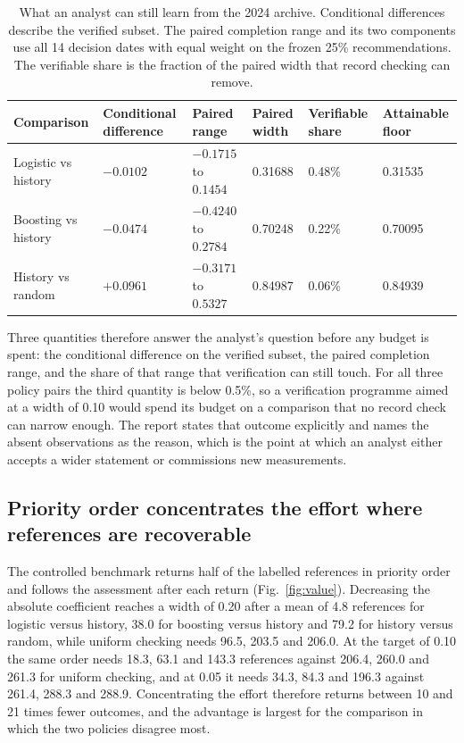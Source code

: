 \documentclass[a4paper,fleqn,longmktitle]{cas-sc}
\begin{document}
\begin{table}[pos=h]
\caption{What an analyst can still learn from the 2024 archive. Conditional differences describe the verified subset. The paired completion range and its two components use all 14 decision dates with equal weight on the frozen 25\% recommendations. The verifiable share is the fraction of the paired width that record checking can remove.}\label{tbl:decision}
\small
\begin{tabular}{@{}p{}p{}p{}p{}p{}p{}@{}}
\toprule
Comparison & Conditional difference & Paired range & Paired width & Verifiable share & Attainable floor\\
\midrule
Logistic vs history & $-0.0102$ & $-0.1715$ to $0.1454$ & 0.31688 & 0.48\% & 0.31535\\
Boosting vs history & $-0.0474$ & $-0.4240$ to $0.2784$ & 0.70248 & 0.22\% & 0.70095\\
History vs random & $+0.0961$ & $-0.3171$ to $0.5327$ & 0.84987 & 0.06\% & 0.84939\\
\bottomrule
\end{tabular}
\end{table}

Three quantities therefore answer the analyst's question before any budget is spent: the conditional difference on the verified subset, the paired completion range, and the share of that range that verification can still touch. For all three policy pairs the third quantity is below 0.5\%, so a verification programme aimed at a width of 0.10 would spend its budget on a comparison that no record check can narrow enough. The report states that outcome explicitly and names the absent observations as the reason, which is the point at which an analyst either accepts a wider statement or commissions new measurements.

\subsection{Priority order concentrates the effort where references are recoverable}\label{sec:controlled}

The controlled benchmark returns half of the labelled references in priority order and follows the assessment after each return (Fig.~\ref{fig:value}). Decreasing the absolute coefficient reaches a width of 0.20 after a mean of 4.8 references for logistic versus history, 38.0 for boosting versus history and 79.2 for history versus random, while uniform checking needs 96.5, 203.5 and 206.0. At the target of 0.10 the same order needs 18.3, 63.1 and 143.3 references against 206.4, 260.0 and 261.3 for uniform checking, and at 0.05 it needs 34.3, 84.3 and 196.3 against 261.4, 288.3 and 288.9. Concentrating the effort therefore returns between 10 and 21 times fewer outcomes, and the advantage is largest for the comparison in which the two policies disagree most.
\end{document}
